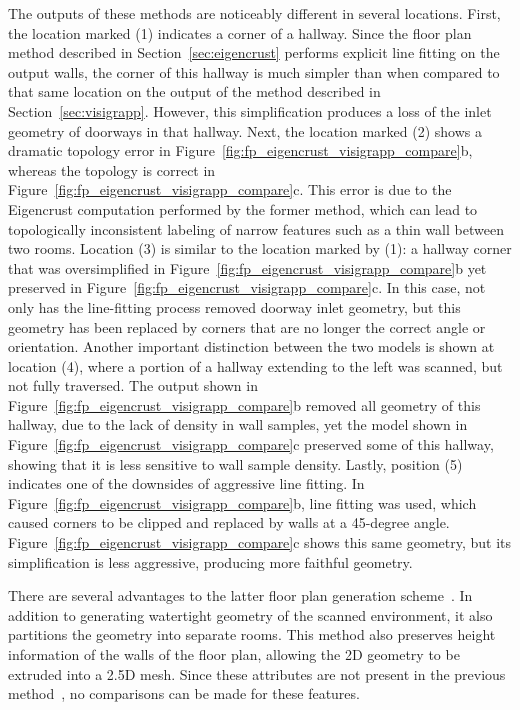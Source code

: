 \documentclass[12pt,onecolumn,oneside]{book}
\begin{document}
The outputs of these methods are noticeably different in several locations.  First, the location marked (1) indicates a corner of a hallway.  Since the floor plan method described in Section~\ref{sec:eigencrust} performs explicit line fitting on the output walls, the corner of this hallway is much simpler than when compared to that same location on the output of the method described in Section~\ref{sec:visigrapp}.  However, this simplification produces a loss of the inlet geometry of doorways in that hallway.  Next, the location marked (2) shows a dramatic topology error in Figure~\ref{fig:fp_eigencrust_visigrapp_compare}b, whereas the topology is correct in Figure~\ref{fig:fp_eigencrust_visigrapp_compare}c.  This error is due to the Eigencrust computation performed by the former method, which can lead to topologically inconsistent labeling of narrow features such as a thin wall between two rooms.  Location (3) is similar to the location marked by (1): a hallway corner that was oversimplified in Figure~\ref{fig:fp_eigencrust_visigrapp_compare}b yet preserved in Figure~\ref{fig:fp_eigencrust_visigrapp_compare}c.  In this case, not only has the line-fitting process removed doorway inlet geometry, but this geometry has been replaced by corners that are no longer the correct angle or orientation.  Another important distinction between the two models is shown at location (4), where a portion of a hallway extending to the left was scanned, but not fully traversed.  The output shown in Figure~\ref{fig:fp_eigencrust_visigrapp_compare}b removed all geometry of this hallway, due to the lack of density in wall samples, yet the model shown in Figure~\ref{fig:fp_eigencrust_visigrapp_compare}c preserved some of this hallway, showing that it is less sensitive to wall sample density.  Lastly, position (5) indicates one of the downsides of aggressive line fitting.  In Figure~\ref{fig:fp_eigencrust_visigrapp_compare}b, line fitting was used, which caused corners to be clipped and replaced by walls at a 45-degree angle.  Figure~\ref{fig:fp_eigencrust_visigrapp_compare}c shows this same geometry, but its simplification is less aggressive, producing more faithful geometry.

There are several advantages to the latter floor plan generation scheme~\cite{Turner14}.  In addition to generating watertight geometry of the scanned environment, it also partitions the geometry into separate rooms.  This method also preserves height information of the walls of the floor plan, allowing the 2D geometry to be extruded into a 2.5D mesh.  Since these attributes are not present in the previous method~\cite{Turner12}, no comparisons can be made for these features.
\end{document}
